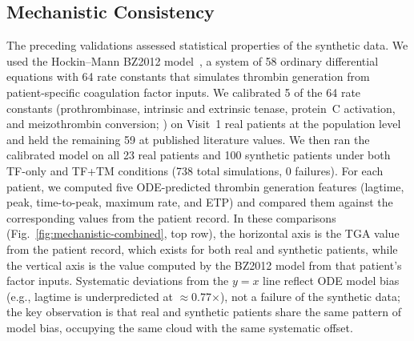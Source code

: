 \subsection{Mechanistic Consistency}
\label{sec:results-l4}

The preceding validations assessed statistical properties of the synthetic data. 
We used the Hockin--Mann BZ2012 model~\citep{Hockin2002,BrummelZiedins2012}, a system
of 58 ordinary differential equations with 64 rate constants that simulates thrombin
generation from patient-specific coagulation factor inputs. We calibrated 5 of the
64 rate constants (prothrombinase, intrinsic and extrinsic tenase, protein~C
activation, and meizothrombin conversion; ) on Visit~1 real
patients at the population level and held the remaining 59 at published literature
values. We then ran the calibrated model on all 23 real patients and 100 synthetic
patients under both TF-only and TF+TM conditions (738 total simulations, 0 failures). For each patient, we
computed five ODE-predicted thrombin generation features (lagtime, peak, time-to-peak,
maximum rate, and ETP) and compared them against the corresponding values from the
patient record. In these comparisons (Fig.~\ref{fig:mechanistic-combined}, top row),
the horizontal axis is the TGA value from the patient record, which exists for both
real and synthetic patients, while the vertical axis is the value computed by the
BZ2012 model from that patient's factor inputs. Systematic deviations from the
$y{=}x$ line reflect ODE model bias (e.g., lagtime is underpredicted at
$\approx$0.77$\times$), not a failure of the synthetic data; the key observation is
that real and synthetic patients share the same pattern of model bias, occupying the
same cloud with the same systematic offset.

